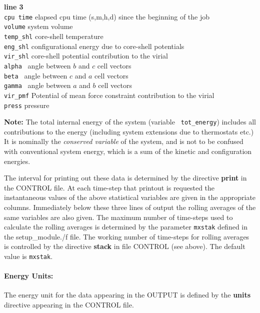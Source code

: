 \begin{tabbing}
{\bf line 3}\\
\> {\tt cpu time} \> elapsed cpu time (s,m,h,d) since the beginning of the job\\
\> {\tt volume} \> system volume\\
\> {\tt temp\_shl} \> core-shell  temperature\\
\> {\tt eng\_shl} \> configurational energy due to core-shell
potentials\\
\> {\tt vir\_shl} \> core-shell potential contribution to the virial\\
\> {\tt alpha } \> angle between $b$ and $c$ cell vectors\\
\> {\tt beta } \> angle between $c$ and $a$ cell vectors\\
\> {\tt gamma } \> angle between $a$ and $b$ cell vectors\\
\> {\tt vir\_pmf} \> Potential of mean force constraint contribution
to the virial\\
\> {\tt press} \> pressure\\
\end{tabbing}

{\bf Note:} The total internal energy of the system (variable {\tt
tot\_energy}) includes all contributions to the energy (including
system extensions due to thermostats etc.) It is nominally the {\em
conserved variable} of the system, and is not to be confused with
conventional system energy, which is a sum of the kinetic and
configuration energies.

The interval for printing out these data is determined by the
directive {\bf print} in the CONTROL file.  At each time-step that
printout is requested the instantaneous values of the above
statistical variables are given in the appropriate columns.
Immediately below these three lines of output the rolling averages of
the same variables are also given. The maximum number of
time-steps used to calculate the
rolling averages is determined by the parameter {\tt mxstak} defined
in the {\sc setup\_module./f} file.
The working number of time-steps for rolling averages
is controlled by the directive {\bf stack} in file CONTROL (see
above).  The default value is {\tt mxstak}.

\paragraph*{Energy Units:}

The energy unit for the data appearing in the OUTPUT is defined by the
{\bf units} directive appearing in the CONTROL file. 

